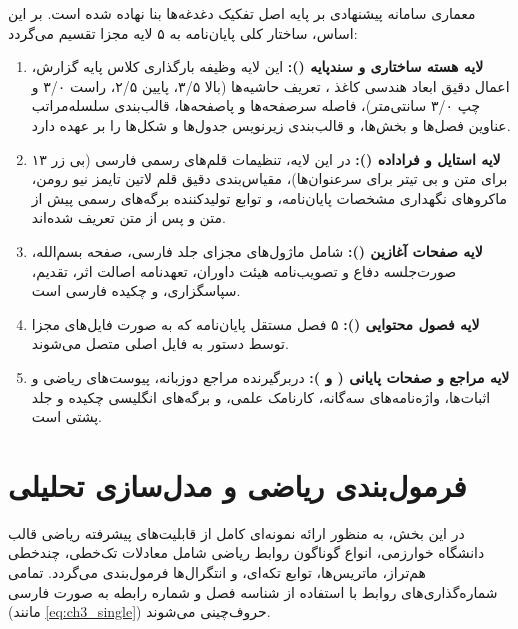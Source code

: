 معماری سامانه پیشنهادی بر پایه اصل تفکیک دغدغه‌ها بنا نهاده شده است. بر این اساس، ساختار کلی پایان‌نامه به ۵ لایه مجزا تقسیم می‌گردد:
\begin{enumerate}
  \item \textbf{لایه هسته ساختاری و سندپایه ():} این لایه وظیفه بارگذاری کلاس پایه گزارش، اعمال دقیق ابعاد هندسی کاغذ ، تعریف حاشیه‌ها (بالا ۳/۵، پایین ۲/۵، راست ۳/۰ و چپ ۳/۰ سانتی‌متر)، فاصله سرصفحه‌ها و پاصفحه‌ها، قالب‌بندی سلسله‌مراتب عناوین فصل‌ها و بخش‌ها، و قالب‌بندی زیرنویس جدول‌ها و شکل‌ها را بر عهده دارد.
  \item \textbf{لایه استایل و فراداده ():} در این لایه، تنظیمات قلم‌های رسمی فارسی (بی زر ۱۳ برای متن و بی تیتر برای سرعنوان‌ها)، مقیاس‌بندی دقیق قلم لاتین تایمز نیو رومن، ماکروهای نگهداری مشخصات پایان‌نامه، و توابع تولیدکننده برگه‌های رسمی پیش از متن و پس از متن تعریف شده‌اند.
  \item \textbf{لایه صفحات آغازین ():} شامل ماژول‌های مجزای جلد فارسی، صفحه بسم‌الله، صورت‌جلسه دفاع و تصویب‌نامه هیئت داوران، تعهدنامه اصالت اثر، تقدیم، سپاسگزاری، و چکیده فارسی است.
  \item \textbf{لایه فصول محتوایی ():} ۵ فصل مستقل پایان‌نامه که به صورت فایل‌های مجزا توسط دستور  به فایل اصلی متصل می‌شوند.
  \item \textbf{لایه مراجع و صفحات پایانی ( و ):} دربرگیرنده مراجع دوزبانه، پیوست‌های ریاضی و اثبات‌ها، واژه‌نامه‌های سه‌گانه، کارنامک علمی، و برگه‌های انگلیسی چکیده و جلد پشتی است.
\end{enumerate}

\section{فرمول‌بندی ریاضی و مدل‌سازی تحلیلی}
\label{sec:ch3_formulation}

در این بخش، به منظور ارائه نمونه‌ای کامل از قابلیت‌های پیشرفته ریاضی قالب دانشگاه خوارزمی، انواع گوناگون روابط ریاضی شامل معادلات تک‌خطی، چندخطی هم‌تراز، ماتریس‌ها، توابع تکه‌ای، و انتگرال‌ها فرمول‌بندی می‌گردد. تمامی شماره‌گذاری‌های روابط با استفاده از شناسه فصل و شماره رابطه به صورت فارسی (مانند \eqref{eq:ch3_single}) حروف‌چینی می‌شوند.

